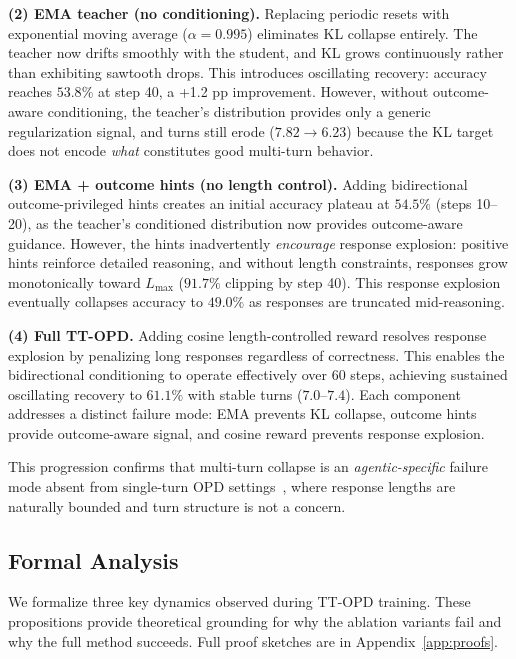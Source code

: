 \documentclass{article}
\begin{document}
\textbf{(2) EMA teacher (no conditioning).} Replacing periodic resets with exponential moving average ($\alpha{=}0.995$) eliminates KL collapse entirely. The teacher now drifts smoothly with the student, and KL grows continuously rather than exhibiting sawtooth drops. This introduces oscillating recovery: accuracy reaches $53.8\%$ at step 40, a +1.2 pp improvement. However, without outcome-aware conditioning, the teacher's distribution provides only a generic regularization signal, and turns still erode ($7.82 \to 6.23$) because the KL target does not encode \emph{what} constitutes good multi-turn behavior.

\textbf{(3) EMA + outcome hints (no length control).} Adding bidirectional outcome-privileged hints creates an initial accuracy plateau at $54.5\%$ (steps 10--20), as the teacher's conditioned distribution now provides outcome-aware guidance. However, the hints inadvertently \emph{encourage} response explosion: positive hints reinforce detailed reasoning, and without length constraints, responses grow monotonically toward $L_{\max}$ ($91.7\%$ clipping by step 40). This response explosion eventually collapses accuracy to $49.0\%$ as responses are truncated mid-reasoning.

\textbf{(4) Full TT-OPD.} Adding cosine length-controlled reward resolves response explosion by penalizing long responses regardless of correctness. This enables the bidirectional conditioning to operate effectively over 60 steps, achieving sustained oscillating recovery to $61.1\%$ with stable turns ($7.0$--$7.4$). Each component addresses a distinct failure mode: EMA prevents KL collapse, outcome hints provide outcome-aware signal, and cosine reward prevents response explosion.

This progression confirms that multi-turn collapse is an \emph{agentic-specific} failure mode absent from single-turn OPD settings~\citep{zhao26opsd, yang26rlsd}, where response lengths are naturally bounded and turn structure is not a concern.




\subsection{Formal Analysis}
\label{sec:formal}

We formalize three key dynamics observed during TT-OPD training. These propositions provide theoretical grounding for why the ablation variants fail and why the full method succeeds. Full proof sketches are in Appendix~\ref{app:proofs}.
\end{document}
